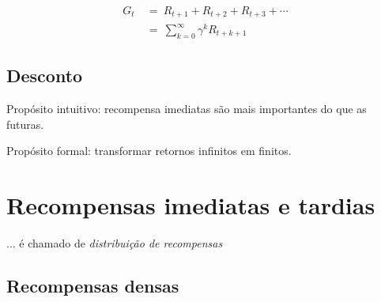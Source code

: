 \documentclass{article}
\begin{document}
                \begin{equation}
                \begin{split}
                    G_t & \ = \ R_{t+1} + R_{t+2} + R_{t+3} + \cdots \\
                    & \ = \ \sum_{k=0}^{\infty} \gamma^k R_{t + k + 1}
                \end{split}
                \end{equation}
        
        \subsection{Desconto}
        
            Propósito intuitivo: recompensa imediatas são mais importantes do que as futuras.
            
            Propósito formal: transformar retornos infinitos em finitos.
    
    \section{Recompensas imediatas e tardias}
    
        ... é chamado de \emph{distribuição de recompensas}
    
        \subsection{Recompensas densas}
        
\end{document}
